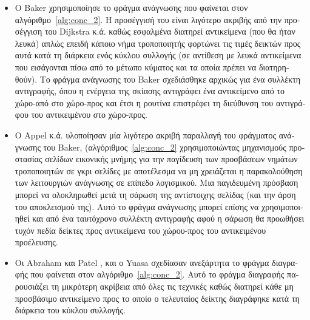 \begin{greek}
\begin{itemize}
  \item Ο Baker \cite{DBLP:journals/cacm/Baker78} χρησιμοποίησε
    το φράγμα ανάγνωσης που φαίνεται στον αλγόριθμο~\ref{alg:conc_2}. Η
    προσέγγισή του είναι λιγότερο ακριβής από την προσέγγιση του
    Dijkstra κ.ά. καθώς εσφαλμένα διατηρεί αντικείμενα (που θα
    ήταν λευκά) απλώς επειδή κάποιο νήμα τροποποιητής φορτώνει
    τις τιμές δεικτών προς αυτά κατά τη διάρκεια ενός κύκλου
    συλλογής (σε αντίθεση με λευκά αντικείμενα που εισάγονται
    πίσω από το μέτωπο κύματος και τα οποία πρέπει να διατηρηθούν).
    Το φράγμα ανάγνωσης του Baker σχεδιάσθηκε αρχικώς για ένα
    συλλέκτη αντιγραφής, όπου η ενέργεια της σκίασης αντιγράφει
    ένα αντικείμενο από το χώρο-από στο χώρο-προς και έτσι η
    ρουτίνα  επιστρέφει τη διεύθυνση του αντιγράφου
    του αντικειμένου στο χώρο-προς. 
  \item Ο Appel κ.ά. \cite{DBLP:conf/pldi/AppelEL88} υλοποίησαν
    μία λιγότερο ακριβή παραλλαγή του φράγματος ανάγνωσης του
    Baker, (αλγόριθμος~\ref{alg:conc_2} χρησιμοποιώντας μηχανισμούς
    προστασίας σελίδων εικονικής μνήμης για την παγίδευση των
    προσβάσεων νημάτων τροποποιητών σε γκρι σελίδες με αποτέλεσμα
    να μη χρειάζεται η παρακολούθηση των λειτουργιών ανάγνωσης σε
    επίπεδο λογισμικού. Μια παγιδευμένη πρόσβαση μπορεί να
    ολοκληρωθεί μετά τη σάρωση της αντίστοιχης σελίδας (και την
    άρση του αποκλεισμού της). Αυτό το φράγμα ανάγνωσης μπορεί
    επίσης να χρησιμοποιηθεί και από ένα ταυτόχρονο συλλέκτη
    αντιγραφής αφού η σάρωση θα προωθήσει τυχόν πεδία δείκτες
    προς αντικείμενα του χώρου-προς του αντικειμένου προέλευσης.   
  \item Οι Abraham και Patel \cite{DBLP:conf/icpp/AbrahamP87},
    και ο Yuasa \cite{DBLP:journals/jss/Yuasa90} σχεδίασαν
    ανεξάρτητα το φράγμα διαγραφής που φαίνεται στον αλγόριθμο~\ref{alg:conc_2}.
    Αυτό το φράγμα διαγραφής παρουσιάζει τη μικρότερη
    ακρίβεια από όλες τις τεχνικές καθώς διατηρεί κάθε μη
    προσβάσιμο αντικείμενο προς το οποίο ο τελευταίος δείκτης
    διαγράφηκε κατά τη διάρκεια του κύκλου συλλογής. 
\end{itemize}


\end{greek}
